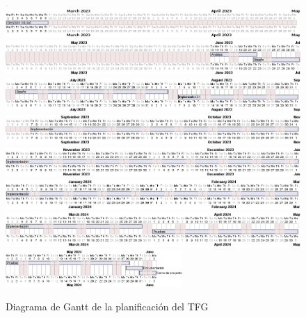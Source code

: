 \begin{figure}[H]
	\includegraphics[width=0.01\textwidth]{4-PlanificacionYGestionDelTFG/PlanificacionFinal/gantt/gant2.png}
	\vspace{0.4cm}
	\includegraphics[width=1\textwidth]{4-PlanificacionYGestionDelTFG/PlanificacionFinal/gantt/gant1.png}
	\vspace{0.4cm}
	\includegraphics[width=1\textwidth]{4-PlanificacionYGestionDelTFG/PlanificacionFinal/gantt/gant2.png}
	\vspace{0.4cm}
	\includegraphics[width=1\textwidth]{4-PlanificacionYGestionDelTFG/PlanificacionFinal/gantt/gant3.png}
	\vspace{0.4cm}
	\includegraphics[width=1\textwidth]{4-PlanificacionYGestionDelTFG/PlanificacionFinal/gantt/gant4.png}
	\vspace{0.4cm}
	\includegraphics[width=1\textwidth]{4-PlanificacionYGestionDelTFG/PlanificacionFinal/gantt/gant5.png}
	\vspace{0.4cm}
	\includegraphics[width=1\textwidth]{4-PlanificacionYGestionDelTFG/PlanificacionFinal/gantt/gant6.png}
	\vspace{0.4cm}
	\includegraphics[width=1\textwidth]{4-PlanificacionYGestionDelTFG/PlanificacionFinal/gantt/gant7.png}
	\vspace{0.4cm}
	\includegraphics[width=0.6\textwidth]{4-PlanificacionYGestionDelTFG/PlanificacionFinal/gantt/gant8.png}
	\caption{Diagrama de Gantt de la planificación del TFG}
\end{figure}


